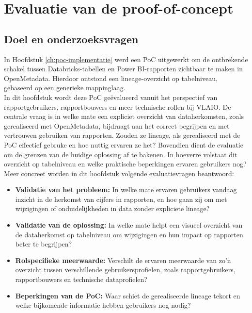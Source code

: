 \chapter{Evaluatie van de proof-of-concept}
\label{ch:poc-evaluatie}

\section{Doel en onderzoeksvragen}

In Hoofdstuk \ref{ch:poc-implementatie} werd een PoC uitgewerkt om de ontbrekende schakel tussen Data\-bricks-ta\-bel\-len en Power BI-rap\-por\-ten zichtbaar te maken in OpenMetadata. Hierdoor ontstond een li\-ne\-age-ov\-er\-zicht op tabelniveau, gebaseerd op een generieke mappinglaag.\\

In dit hoofdstuk wordt deze PoC geëvalueerd vanuit het perspectief van rapportgebruikers, rapportbouwers en meer technische rollen bij VLAIO. De centrale vraag is in welke mate een expliciet overzicht van dataherkomsten, zoals gerealiseerd met OpenMetadata, bijdraagt aan het correct begrijpen en met vertrouwen gebruiken van rapporten. Zouden ze lineage, als gerealiseerd met de PoC effectief gebruke en hoe nuttig ervaren ze het? Bovendien dient de evaluatie om de grenzen van de huidige oplossing af te bakenen. In hoeverre volstaat dit overzicht op tabelniveau en welke praktische beperkingen ervaren gebruikers nog?\\

Meer concreet worden in dit hoofdstuk volgende evaluatievragen beantwoord:
\begin{itemize}
    \item \textbf{Validatie van het probleem:} In welke mate ervaren gebruikers vandaag inzicht in de herkomst van cijfers in rapporten, en hoe gaan zij om met wijzigingen of onduidelijkheden in data zonder expliciete lineage?
    \item \textbf{Validatie van de oplossing:} In welke mate helpt een visueel overzicht van de dataherkomst op tabelniveau om wijzigingen en hun impact op rapporten beter te begrijpen?
    \item \textbf{Rolspecifieke meerwaarde:} Verschilt de ervaren meerwaarde van zo'n overzicht tussen verschillende gebruikersprofielen, zoals rapportgebruikers, rapportbouwers en technische dataprofielen?
    \item \textbf{Beperkingen van de PoC:} Waar schiet de gerealiseerde lineage tekort en welke bijkomende informatie hebben gebruikers nog nodig?
    
\end{itemize}

